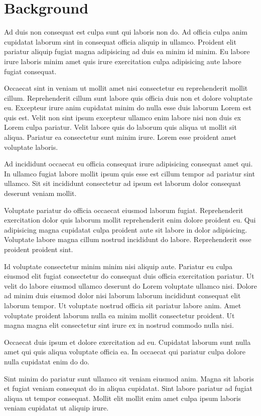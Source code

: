 \section{Background}
Ad duis non consequat est culpa sunt qui laboris non do. Ad officia culpa anim cupidatat laborum sint in consequat officia aliquip in ullamco. Proident elit pariatur aliquip fugiat magna adipisicing ad duis ea minim id minim. Eu labore irure laboris minim amet quis irure exercitation culpa adipisicing aute labore fugiat consequat.

Occaecat sint in veniam ut mollit amet nisi consectetur eu reprehenderit mollit cillum. Reprehenderit cillum sunt labore quis officia duis non et dolore voluptate eu. Excepteur irure anim cupidatat minim do nulla esse duis laborum Lorem est quis est. Velit non sint ipsum excepteur ullamco enim labore nisi non duis ex Lorem culpa pariatur. Velit labore quis do laborum quis aliqua ut mollit sit aliqua. Pariatur ea consectetur sunt minim irure. Lorem esse proident amet voluptate laboris.

Ad incididunt occaecat eu officia consequat irure adipisicing consequat amet qui. In ullamco fugiat labore mollit ipsum quis esse est cillum tempor ad pariatur sint ullamco. Sit sit incididunt consectetur ad ipsum est laborum dolor consequat deserunt veniam mollit.

Voluptate pariatur do officia occaecat eiusmod laborum fugiat. Reprehenderit exercitation dolor quis laborum mollit reprehenderit enim dolore proident eu. Qui adipisicing magna cupidatat culpa proident aute sit labore in dolor adipisicing. Voluptate labore magna cillum nostrud incididunt do labore. Reprehenderit esse proident proident sint.

Id voluptate consectetur minim minim nisi aliquip aute. Pariatur eu culpa eiusmod elit fugiat consectetur do consequat duis officia exercitation pariatur. Ut velit do labore eiusmod ullamco deserunt do Lorem voluptate ullamco nisi. Dolore ad minim duis eiusmod dolor nisi laborum laborum incididunt consequat elit laborum tempor. Ut voluptate nostrud officia sit pariatur labore anim. Amet voluptate proident laborum nulla ea minim mollit consectetur proident. Ut magna magna elit consectetur sint irure ex in nostrud commodo nulla nisi.

Occaecat duis ipsum et dolore exercitation ad eu. Cupidatat laborum sunt nulla amet qui quis aliqua voluptate officia ea. In occaecat qui pariatur culpa dolore nulla cupidatat enim do do.

Sint minim do pariatur sunt ullamco sit veniam eiusmod anim. Magna sit laboris et fugiat veniam consequat do in aliqua cupidatat. Sint labore pariatur ad fugiat aliqua ut tempor consequat. Mollit elit mollit enim amet culpa ipsum laboris veniam cupidatat ut aliquip irure.

